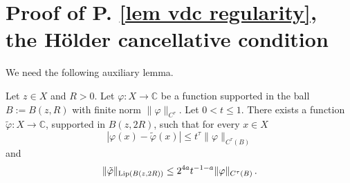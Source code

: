 \chapter{Proof of P. \ref{lem vdc regularity}, the H\"older cancellative condition}
\label{liphoel}

We need the following auxiliary lemma.

\begin{lemma}
    \label{lem regularity aux}
    Let $z\in X$ and $R>0$. Let $\varphi: X \to \mathbb{C}$ be a function supported in the  ball
    $B:=B(z,R)$ with finite norm $\|\varphi\|_{C^\tau}$. Let $0<t \leq 1$. There exists a function $\tilde \varphi : X \to \mathbb{C}$, supported in $B(z,2R)$, such that for every $x\in X$
    \begin{equation}\label{eq firstt}
        |\varphi(x) - \tilde \varphi(x)| \leq t^{\tau} \|\varphi\|_{C^\tau(B)}
    \end{equation}and
    \begin{equation}\label{eq secondt}
        \|\tilde \varphi\|_{\operatorname{\operatorname{Lip}}(B(z,2R))} \leq 2^{4a}t^{-1-a} \|\varphi\|_{C^{\tau}(B)}\, .
    \end{equation}
\end{lemma}


